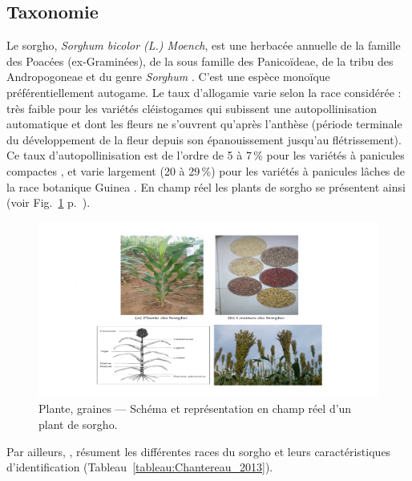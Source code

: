 \documentclass[a4paper,11pt]{article}
\begin{document}
\subsection{Taxonomie}

Le sorgho, \emph{Sorghum bicolor (L.) Moench}, est une herbacée
annuelle de la famille des Poacées (ex-Graminées), de la sous famille
des Panicoïdeae, de la tribu des Andropogoneae et du genre
\emph{Sorghum} \cite{Doggett_1988}. C'est une espèce monoïque
préférentiellement autogame. Le taux d'allogamie varie selon la race
considérée : très faible pour les variétés cléistogames qui subissent
une autopollinisation automatique et dont les fleurs ne s'ouvrent
qu'après l'anthèse (période terminale du développement de la fleur
depuis son épanouissement jusqu'au flétrissement). Ce taux
d'autopollinisation est de l'ordre de 5 à 7\,\% pour les variétés à
panicules compactes \cite{Doggett_1988}, et varie largement (20 à
29\,\%) pour les variétés à panicules lâches de la race botanique
Guinea \cite{Ollitrault_1987,Chantereau_1994}. En champ réel les
plants de sorgho se présentent ainsi (voir
Fig.~\ref{fig-SchemaComposePage5}
p.~\pageref{fig-SchemaComposePage5}).

\begin{figure}
  \begin{center}
    \includegraphics[width=16cm]{images/SchemaComposePage5}
  \end{center}
  \caption{Plante, graines --- Schéma et représentation en champ réel d'un plant de sorgho.}
  \label{fig-SchemaComposePage5}
\end{figure}

Par ailleurs, , résument les différentes
races du sorgho et leurs caractéristiques d'identification
(Tableau~\ref{tableau:Chantereau_2013}).
\end{document}
